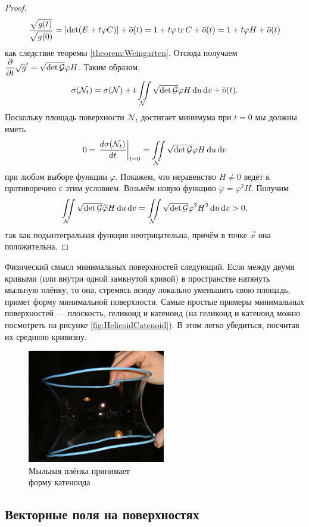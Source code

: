 \begin{proof}
	\[
		\frac{\sqrt{g(t)}}{\sqrt{g(0)}} = \left\lvert\det(E + t\varphi C)\right\rvert + \overline{o}(t) = 1 + t\varphi\operatorname{tr} C + \overline{o}(t) = 1 + t\varphi H + \overline{o}(t)
	\]
	как следствие теоремы \ref{theorem:Weingarten}. Отсюда получаем $\displaystyle\frac{\partial}{\partial t}\sqrt{g}^\prime = \sqrt{\det \mathcal{G}}\varphi H$. Таким образом,
	\[
		\sigma(\mathcal{N}_t) = \sigma(\mathcal{N}) + t\iint\limits_{\mathcal{N}}\sqrt{\det \mathcal{G}}\varphi H\mathop{}\!\mathrm{d} u\mathop{}\!\mathrm{d} v + \overline{o}(t).
	\]
	Поскольку площадь поверхности $\mathcal{N}_t$ достигает минимума при $t = 0$ мы должны иметь
	\[
		0 = \left.\frac{d\sigma(\mathcal{N}_t)}{dt}\right|_{t = 0} = \iint\limits_{\mathcal{N}}\sqrt{\det \mathcal{G}}\varphi H\mathop{}\!\mathrm{d} u\mathop{}\!\mathrm{d} v
	\]
	при любом выборе функции $\varphi$. Покажем, что неравенство $H \ne 0$ ведёт к противоречию с этим условием. Возьмём новую функцию $\widetilde{\varphi} = \varphi^2H$. Получим
	\[
		\iint\limits_{\mathcal{N}}\sqrt{\det \mathcal{G}}\widetilde{\varphi}H\mathop{}\!\mathrm{d} u\mathop{}\!\mathrm{d} v = \iint\limits_{\mathcal{N}}\sqrt{\det\mathcal{G}}\varphi^2H^2\mathop{}\!\mathrm{d} u\mathop{}\!\mathrm{d} v > 0,
	\]
	так как подынтегральная функция неотрицательна, причём в точке $\vec{x}$ она положительна.
\end{proof}

Физический смысл минимальных поверхностей следующий. Если между двумя кривыми (или внутри одной замкнутой кривой) в пространстве натянуть мыльную плёнку, то она, стремясь всюду локально уменьшить свою площадь, примет форму минимальной поверхности. Самые простые примеры минимальных поверхностей --- плоскость, геликоид и катеноид (на геликоид и катеноид можно посмотреть на рисунке \ref{fig:HelicoidCatenoid}). В этом легко убедиться, посчитав их среднюю кривизну.

\begin{figure}[H]
	\centering
	\includegraphics[width=6cm]{./img/Membrane.png}
	\caption{Мыльная плёнка принимает\\ форму катеноида}
\end{figure}

\subsection{Векторные поля на поверхностях}

